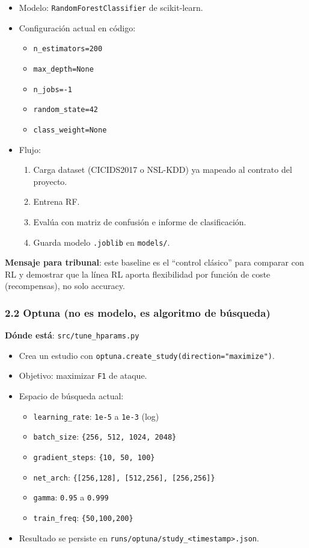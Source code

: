 ﻿\documentclass[12pt,a4paper]{article}
\begin{document}
\begin{itemize}
  \item Modelo: \texttt{RandomForestClassifier} de scikit-learn.
  \item Configuración actual en código:
    \begin{itemize}
      \item \texttt{n\_estimators=200}
      \item \texttt{max\_depth=None}
      \item \texttt{n\_jobs=-1}
      \item \texttt{random\_state=42}
      \item \texttt{class\_weight=None}
    \end{itemize}
  \item Flujo:
    \begin{enumerate}
      \item Carga dataset (CICIDS2017 o NSL-KDD) ya mapeado al contrato del proyecto.
      \item Entrena RF.
      \item Evalúa con matriz de confusión e informe de clasificación.
      \item Guarda modelo \texttt{.joblib} en \verb|models/|.
    \end{enumerate}
\end{itemize}

\textbf{Mensaje para tribunal}: este baseline es el ``control clásico'' para comparar con RL y
demostrar que la línea RL aporta flexibilidad por función de coste (recompensas), no solo accuracy.

\subsubsection{2.2 Optuna (no es modelo, es algoritmo de búsqueda)}

\textbf{Dónde está}: \verb|src/tune_hparams.py|

\begin{itemize}
  \item Crea un estudio con \texttt{optuna.create\_study(direction="maximize")}.
  \item Objetivo: maximizar \texttt{F1} de ataque.
  \item Espacio de búsqueda actual:
    \begin{itemize}
      \item \texttt{learning\_rate}: \texttt{1e-5} a \texttt{1e-3} (log)
      \item \texttt{batch\_size}: \texttt{\{256, 512, 1024, 2048\}}
      \item \texttt{gradient\_steps}: \texttt{\{10, 50, 100\}}
      \item \texttt{net\_arch}: \texttt{\{[256,128], [512,256], [256,256]\}}
      \item \texttt{gamma}: \texttt{0.95} a \texttt{0.999}
      \item \texttt{train\_freq}: \texttt{\{50,100,200\}}
    \end{itemize}
  \item Resultado se persiste en \verb|runs/optuna/study_<timestamp>.json|.
\end{itemize}
\end{document}
